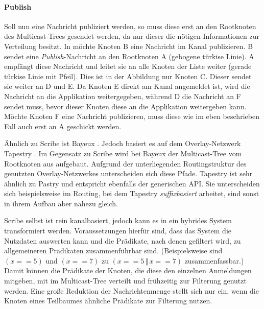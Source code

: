 \paragraph{Publish}
Soll nun eine Nachricht publiziert werden, so muss diese erst an den Rootknoten des Multicast-Trees gesendet werden, da nur dieser die nötigen Informationen zur Verteilung besitzt. In  möchte Knoten B eine Nachricht im Kanal publizieren. B sendet eine \emph{Publish}-Nachricht an den Rootknoten A (gebogene türkise Linie). A empfängt diese Nachricht und leitet sie an alle Knoten der Liste weiter (gerade türkise Linie mit Pfeil). Dies ist in der Abbildung nur Knoten C. Dieser sendet sie weiter an D und E. Da Knoten E direkt am Kanal angemeldet ist, wird die Nachricht an die Applikation weitergegeben, während D die Nachricht an F sendet muss, bevor dieser Knoten diese an die Applikation weitergeben kann. Möchte Knoten F eine Nachricht publizieren, muss diese wie im eben beschrieben Fall auch erst an A geschickt werden.

Ähnlich zu Scribe ist Bayeux \cite{Zhuang2001}. Jedoch basiert es auf dem Overlay-Netzwerk Tapestry \cite{Zhao2004Tapestry}. Im Gegensatz zu Scribe wird bei Bayeux der Multicast-Tree vom Rootknoten aus aufgebaut. Aufgrund der unterliegenden Routingstruktur des genutzten Overlay-Netzwerkes unterscheiden sich diese Pfade. Tapestry ist sehr ähnlich zu Pastry und entspricht ebenfalls der generischen API. Sie unterscheiden sich beispielsweise im Routing, bei dem Tapestry \emph{suffixbasiert} arbeitet, sind sonst in ihrem Aufbau aber nahezu gleich.

Scribe selbst ist rein kanalbasiert, jedoch kann es in ein hybrides System transformiert werden. Voraussetzungen hierfür sind, dass das System die Nutzdaten auswerten kann und die Prädikate, nach denen gefiltert wird, zu allgemeineren Prädikaten zusammenführbar sind. (Beispielsweise sind $(x == 5)$ und $(x == 7)$ zu $(x == 5\,\Vert\,x == 7)$ zusammenfassbar.) Damit können die Prädikate der Knoten, die diese den einzelnen Anmeldungen mitgeben, mit im Multicast-Tree verteilt und frühzeitig zur Filterung genutzt werden. Eine große Reduktion der Nachrichtenmenge stellt sich nur ein, wenn die Knoten eines Teilbaumes ähnliche Prädikate zur Filterung nutzen.
